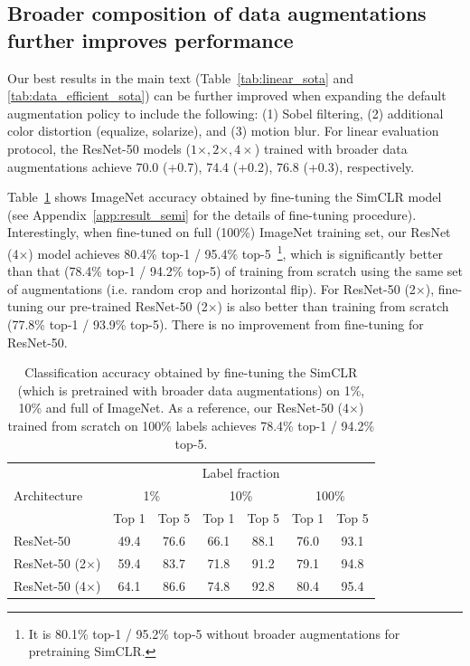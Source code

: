 \documentclass{article}
\begin{document}
\subsection{Broader composition of data augmentations further improves performance}
\label{app:broader_augmentation}

Our best results in the main text (Table~\ref{tab:linear_sota} and \ref{tab:data_efficient_sota}) can be further improved when expanding the default augmentation policy to include the following: (1) Sobel filtering, (2) additional color distortion (equalize, solarize), and (3) motion blur. For linear evaluation protocol, the ResNet-50 models ($1\times, 2\times, 4\times$) trained with broader data augmentations achieve 70.0 (+0.7), 74.4 (+0.2), 76.8 (+0.3), respectively.

Table~\ref{tab:data_efficient_sota_broader} shows ImageNet accuracy obtained by fine-tuning the SimCLR model (see Appendix~\ref{app:result_semi} for the details of fine-tuning procedure). Interestingly, when fine-tuned on full (100\%) ImageNet training set, our ResNet (4$\times$) model achieves 80.4\% top-1 / 95.4\% top-5~\footnote{It is 80.1\% top-1 / 95.2\% top-5 without broader augmentations for pretraining SimCLR.}, which is significantly better than that (78.4\% top-1 / 94.2\% top-5) of training from scratch using the same set of augmentations (i.e. random crop and horizontal flip). For ResNet-50 (2$\times$), fine-tuning our pre-trained ResNet-50 (2$\times$) is also better than training from scratch (77.8\% top-1 / 93.9\% top-5). There is no improvement from fine-tuning for ResNet-50.

\begin{table}[!h]
    \centering
    \begin{tabular}{lcccccc}
    \toprule
    \multirow{3}{*}{Architecture} & \multicolumn{6}{c}{Label fraction} \\
    & \multicolumn{2}{c}{1\%} & \multicolumn{2}{c}{10\%} & \multicolumn{2}{c}{100\%}  \\
    & Top 1 & Top 5 & Top 1 & Top 5 & Top 1 & Top 5\\  \midrule
    ResNet-50 & 49.4 & 	76.6 & 	66.1 & 88.1 & 76.0 & 93.1\\
    ResNet-50 (2$\times$) & 59.4 & 83.7 & 71.8 & 91.2 & 79.1 & 94.8 \\
    ResNet-50 (4$\times$) & 64.1 & 86.6 & 74.8 & 92.8 & 80.4 & 95.4\\
    \bottomrule
    \end{tabular}
    \caption{Classification accuracy obtained by fine-tuning the SimCLR (which is pretrained with broader data augmentations) on 1\%, 10\% and full of ImageNet. As a reference, our ResNet-50 (4$\times$) trained from scratch on 100\% labels achieves 78.4\% top-1 / 94.2\% top-5.}
    \label{tab:data_efficient_sota_broader}
\end{table}
\end{document}
